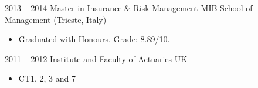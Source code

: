 \documentclass[a4paper,]{fortysecondscv}
\begin{document}




\begin{cvtable}[2]
    \cvitem
    {2013 -- 2014}
    {Master in Insurance \& Risk Management}
    {MIB School of Management (Trieste, Italy)}
    {
        \begin{itemize}[nosep, leftmargin=0pt, label={}] %
            \item Graduated with Honours. Grade: 8.89/10.
        \end{itemize}
    }
    \cvitem
    {2011 -- 2012}
    {Institute and Faculty of Actuaries}
    {UK}
    {
        \vspace{-\topsep}
        \begin{itemize}[nosep, leftmargin=0pt, label={}]
            \item CT1, 2, 3 and 7
        \end{itemize}
    }


\end{cvtable}
\end{document}
